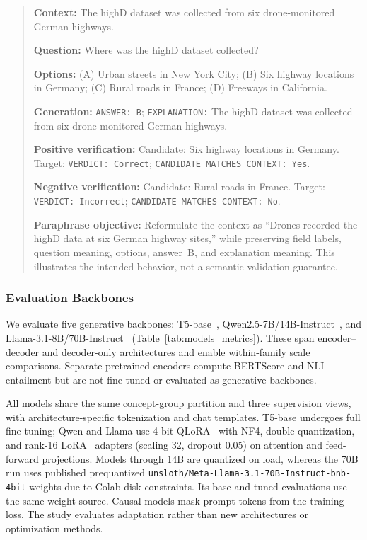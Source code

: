 \documentclass[a4paper,fleqn]{cas-sc}
\begin{document}
\begin{quote}
\small
\noindent\textbf{Context:} The highD dataset was collected from six drone-monitored German highways.

\noindent\textbf{Question:} Where was the highD dataset collected?

\noindent\textbf{Options:} (A) Urban streets in New York City; (B) Six highway locations in Germany; (C) Rural roads in France; (D) Freeways in California.

\noindent\textbf{Generation:} \texttt{ANSWER: B}; \texttt{EXPLANATION:} The highD dataset was collected from six drone-monitored German highways.

\noindent\textbf{Positive verification:} Candidate: Six highway locations in Germany. Target: \texttt{VERDICT: Correct}; \texttt{CANDIDATE MATCHES CONTEXT: Yes}.

\noindent\textbf{Negative verification:} Candidate: Rural roads in France. Target: \texttt{VERDICT: Incorrect}; \texttt{CANDIDATE MATCHES CONTEXT: No}.

\noindent\textbf{Paraphrase objective:} Reformulate the context as ``Drones recorded the highD data at six German highway sites,'' while preserving field labels, question meaning, options, answer~B, and explanation meaning. This illustrates the intended behavior, not a semantic-validation guarantee.
\end{quote}


\subsubsection{Evaluation Backbones}

We evaluate five generative backbones: T5-base~\cite{raffel2020exploring}, Qwen2.5-7B/14B-Instruct~\cite{yang2024qwen25}, and Llama-3.1-8B/70B-Instruct~\cite{grattafiori2024llama} (Table~\ref{tab:models_metrics}). These span encoder--decoder and decoder-only architectures and enable within-family scale comparisons. Separate pretrained encoders compute BERTScore and NLI entailment but are not fine-tuned or evaluated as generative backbones.

All models share the same concept-group partition and three supervision views, with architecture-specific tokenization and chat templates. T5-base undergoes full fine-tuning; Qwen and Llama use 4-bit QLoRA~\cite{dettmers2023qlora} with NF4, double quantization, and rank-16 LoRA~\cite{hu2022lora} adapters (scaling 32, dropout 0.05) on attention and feed-forward projections. Models through 14B are quantized on load, whereas the 70B run uses published prequantized \texttt{unsloth/Meta-Llama-3.1-70B-Instruct-bnb-4bit} weights due to Colab disk constraints. Its base and tuned evaluations use the same weight source. Causal models mask prompt tokens from the training loss. The study evaluates adaptation rather than new architectures or optimization methods.
\end{document}
